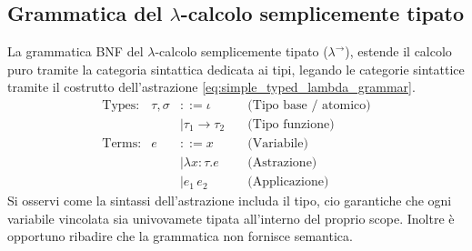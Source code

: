 \subsection{Grammatica del \texorpdfstring{$\lambda$}{Lambda}-calcolo semplicemente tipato}
La grammatica BNF del $\lambda$-calcolo semplicemente tipato ($\lambda^{\to}$), estende il calcolo puro tramite
la categoria sintattica dedicata ai tipi, legando le categorie sintattice tramite il costrutto dell'astrazione 
\eqref{eq:simple_typed_lambda_grammar}.
\begin{equation}
    \begin{array}{lrll}
        \text{Types:}   & \tau, \sigma & ::= \iota \quad                & \text{(Tipo base / atomico)}      \\
                        &              & \mid \tau_1 \to \tau_2 \quad   & \text{(Tipo funzione)}            \\
        \text{Terms:}   & e            & ::= x \quad                    & \text{(Variabile)}                \\
                        &              & \mid \lambda x : \tau . e \quad& \text{(Astrazione)}               \\
                        &              & \mid e_1 \, e_2 \quad          & \text{(Applicazione)}
    \end{array}
    \tag{STLC}
    \label{eq:simple_typed_lambda_grammar}
\end{equation}
Si osservi come la sintassi dell'astrazione includa il tipo, cio garantiche che ogni variabile vincolata sia univovamete tipata 
all'interno del proprio scope. Inoltre è opportuno ribadire che la grammatica non fornisce semantica.

